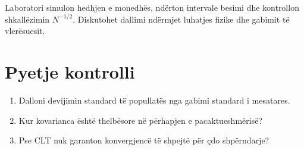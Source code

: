 \begin{lidhje}
Laboratori simulon hedhjen e monedhës, ndërton intervale besimi dhe kontrollon shkallëzimin $N^{-1/2}$. Diskutohet dallimi ndërmjet luhatjes fizike dhe gabimit të vlerësuesit.
\end{lidhje}

\section*{Pyetje kontrolli}
\begin{enumerate}
\item Dalloni devijimin standard të popullatës nga gabimi standard i mesatares.
\item Kur kovarianca është thelbësore në përhapjen e pacaktueshmërisë?
\item Pse CLT nuk garanton konvergjencë të shpejtë për çdo shpërndarje?
\end{enumerate}



